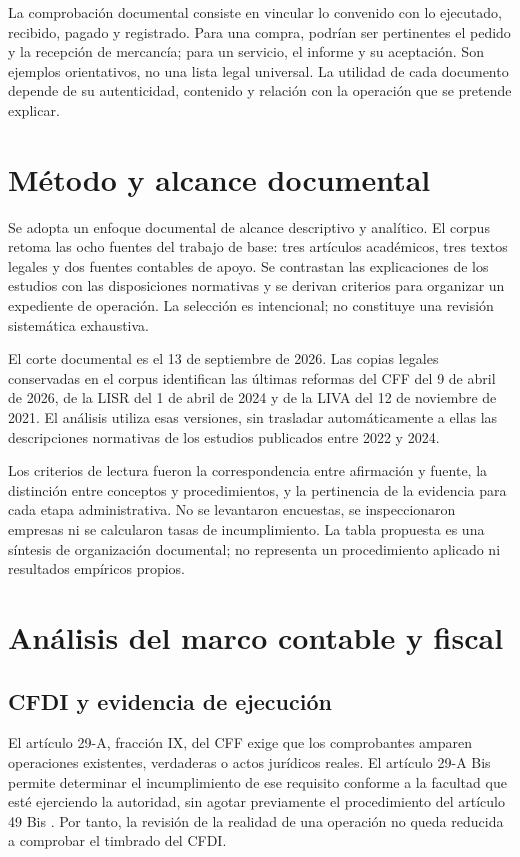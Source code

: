 La comprobación documental consiste en vincular lo convenido con lo
ejecutado, recibido, pagado y registrado. Para una compra, podrían ser
pertinentes el pedido y la recepción de mercancía; para un servicio, el
informe y su aceptación. Son ejemplos orientativos, no una lista legal
universal. La utilidad de cada documento depende de su autenticidad,
contenido y relación con la operación que se pretende explicar.

\section{Método y alcance documental}

Se adopta un enfoque documental de alcance descriptivo y analítico. El corpus
retoma las ocho fuentes del trabajo de base: tres artículos académicos, tres
textos legales y dos fuentes contables de apoyo. Se contrastan las
explicaciones de los estudios con las disposiciones normativas y se derivan
criterios para organizar un expediente de operación. La selección es
intencional; no constituye una revisión sistemática exhaustiva.

El corte documental es el 13 de septiembre de 2026. Las copias legales
conservadas en el corpus identifican las últimas reformas del CFF del 9 de
abril de 2026, de la LISR del 1 de abril de 2024 y de la LIVA del 12 de
noviembre de 2021. El análisis utiliza esas versiones, sin trasladar
automáticamente a ellas las descripciones normativas de los estudios
publicados entre 2022 y 2024.

Los criterios de lectura fueron la correspondencia entre afirmación y fuente,
la distinción entre conceptos y procedimientos, y la pertinencia de la evidencia
para cada etapa administrativa. No se levantaron encuestas, se inspeccionaron
empresas ni se calcularon tasas de incumplimiento. La tabla propuesta es una
síntesis de organización documental; no representa un procedimiento aplicado
ni resultados empíricos propios.

\section{Análisis del marco contable y fiscal}

\subsection{CFDI y evidencia de ejecución}

El artículo 29-A, fracción IX, del CFF exige que los comprobantes amparen
operaciones existentes, verdaderas o actos jurídicos reales. El artículo
29-A Bis permite determinar el incumplimiento de ese requisito conforme a
la facultad que esté ejerciendo la autoridad, sin agotar previamente el
procedimiento del artículo 49 Bis
\parencite[arts. 29-A y 29-A Bis]{cff2026}. Por tanto, la revisión de la
realidad de una operación no queda reducida a comprobar el timbrado del CFDI.

